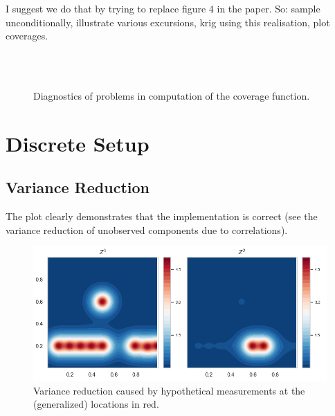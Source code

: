 \documentclass[a4paper,10pt]{article}
\begin{document}
I suggest we do that by trying to replace figure 4 in the paper.
So: sample unconditionally, illustrate various excursions, krig using this
realisation, plot coverages.

\begin{figure}[tbh!p]
\centering
{}\\
\\
\caption{Diagnostics of problems in computation of the coverage function.}
\label{fig:example_inv_prob}
\end{figure}

\newpage
\section{Discrete Setup}

\subsection{Variance Reduction}
The plot clearly demonstrates that the implementation is correct (see the variance reduction of unobserved components due to correlations).

\begin{figure}[tbh!p]
\centering
	\includegraphics[scale=0.8]{images/variance_reduction.png}
\caption{Variance reduction caused by hypothetical measurements at the (generalized) locations in red.}
\end{figure}
\end{document}

